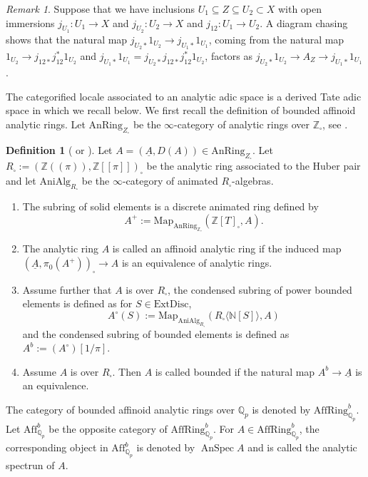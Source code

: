 \documentclass[a4paper,10pt]{amsart}
\theoremstyle{remark}
\newtheorem{remark}[theorem]{Remark}
\theoremstyle{definition}
\newtheorem{definition}[theorem]{Definition}
\theoremstyle{plain}
\numberwithin{equation}{section}
\newcommand{\bbN}{{\mathbb N}}
\newcommand{\bbQ}{{\mathbb Q}}
\newcommand{\bbZ}{{\mathbb Z}}
\newcommand{\AffRingQp}{{\mathrm{AffRing}^b_{\mathbb{Q}_p}}}
\newcommand{\AffQp}{{\mathrm{Aff}^b_{\mathbb{Q}_p}}}
\newcommand{\Map}{\mathrm{Map}}
\newcommand{\Anring}{\mathrm{AnRing}}
\newcommand{\AnialgR}{\mathrm{AniAlg}_{R_\square}}
\DeclareMathOperator{\AnSpec}{AnSpec}
\begin{document}
\begin{remark}\label{remarkmapsfactorizationclosedopen}
	Suppose that we have inclusions
	$U_1\subseteq Z\subseteq U_2\subset X$ with open immersions $j_{U_1}:U_1\to X$ and $j_{U_2}: U_2\to X$ and $j_{12}:U_1\to U_2$. A diagram chasing shows that the natural map 
	$j_{U_2*}1_{U_2}\to j_{U_1*}1_{U_1}$, coming from the natural map $1_{U_2}\to j_{12*}j^*_{12}1_{U_2}$ and $j_{U_1*}1_{U_1}=j_{U_2*}j_{12*}j^*_{12}1_{U_2}$, factors as $j_{U_2*}1_{U_2}\to A_Z\to  j_{U_1*}1_{U_1}$.
\end{remark}

The categorified locale associated to an analytic adic space is a derived Tate adic space in \cite[\S~2]{camargo2024analytic} which we recall below. We first recall the definition of bounded affinoid analytic rings. Let $\mathrm{AnRing}_{Z_{\square}}$ be the $\infty$-category of analytic rings over $\bbZ_{\square}$, see \cite[\S~1]{camargo2024analytic}.
\begin{definition}[{\cite[Def.~2.6.1, Def.~2.6.6, Def.~2.6.10]{camargo2024analytic} or \cite[Def.~7.1.1]{Juan2024solidgeometry}}]\label{definitionaffinoidanalyticring}
Let $A=(\underline{A},D(A))\in \mathrm{AnRing}_{Z_{\square}}$. Let $R_\square:=(\bbZ((\pi)),\bbZ[[\pi]])_\square$ be the analytic ring associated to the Huber pair and let $\AnialgR$ be the $\infty$-category of animated $R_{\square}$-algebras.
\begin{enumerate}
	\item The subring of solid elements is a discrete animated ring defined by
	$$A^+:=\Map_{\Anring_{\bbZ_\square}}(\bbZ[T]_\square,A).$$
	\item  The analytic ring $A$ is called an affinoid analytic ring if the induced map $(\underline{A},\pi_0(A^+))_\square\to A$ is an equivalence of analytic rings.
 \item Assume further that $A$ is over $R_\square$, the condensed subring of power bounded elements is defined as for $S\in \mathrm{ExtDisc}$,
 $$A^\circ(S):=\Map_{\AnialgR}(R_\square\langle\bbN[S]\rangle,A)$$
 and the condensed subring of bounded elements is defined as $A^b:=(A^\circ)[1/\pi]$.
 \item Assume $A$ is over $R_\square$. Then $A$ is called bounded if  the natural map $A^b\to \underline{A}$ is an equivalence.
\end{enumerate}
	The category of bounded affinoid analytic rings over $\bbQ_p$ is denoted by $\AffRingQp$. Let $\AffQp$ be the opposite category of $\AffRingQp$. For $A\in \AffRingQp$, the corresponding object in $\AffQp$ is denoted by $\AnSpec A$ and is called the analytic spectrun of $A$.
\end{definition}
\end{document}
